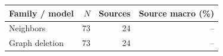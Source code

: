 \begin{tabular}{lrrr}
\toprule
Family / model & $N$ & Sources & Source macro (\%) \\
\midrule
Neighbors & 73 & 24 & -- \\
Graph deletion & 73 & 24 & -- \\
\bottomrule
\end{tabular}
